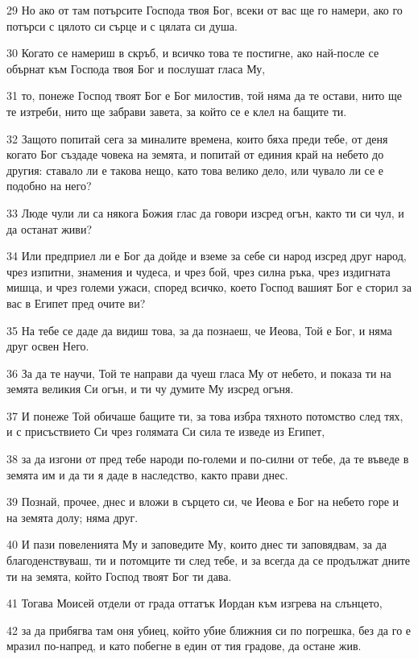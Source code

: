 \par 29 Но ако от там потърсите Господа твоя Бог, всеки от вас ще го намери, ако го потърси с цялото си сърце и с цялата си душа.
\par 30 Когато се намериш в скръб, и всичко това те постигне, ако най-после се обърнат към Господа твоя Бог и послушат гласа Му,
\par 31 то, понеже Господ твоят Бог е Бог милостив, той няма да те остави, нито ще те изтреби, нито ще забрави завета, за който се е клел на бащите ти.
\par 32 Защото попитай сега за миналите времена, които бяха преди тебе, от деня когато Бог създаде човека на земята, и попитай от единия край на небето до другия: ставало ли е такова нещо, като това велико дело, или чувало ли се е подобно на него?
\par 33 Люде чули ли са някога Божия глас да говори изсред огън, както ти си чул, и да останат живи?
\par 34 Или предприел ли е Бог да дойде и вземе за себе си народ изсред друг народ, чрез изпитни, знамения и чудеса, и чрез бой, чрез силна ръка, чрез издигната мишца, и чрез големи ужаси, според всичко, което Господ вашият Бог е сторил за вас в Египет пред очите ви?
\par 35 На тебе се даде да видиш това, за да познаеш, че Иеова, Той е Бог, и няма друг освен Него.
\par 36 За да те научи, Той те направи да чуеш гласа Му от небето, и показа ти на земята великия Си огън, и ти чу думите Му изсред огъня.
\par 37 И понеже Той обичаше бащите ти, за това избра тяхното потомство след тях, и с присъствието Си чрез голямата Си сила те изведе из Египет,
\par 38 за да изгони от пред тебе народи по-големи и по-силни от тебе, да те въведе в земята им и да ти я даде в наследство, както прави днес.
\par 39 Познай, прочее, днес и вложи в сърцето си, че Иеова е Бог на небето горе и на земята долу; няма друг.
\par 40 И пази повеленията Му и заповедите Му, които днес ти заповядвам, за да благоденствуваш, ти и потомците ти след тебе, и за всегда да се продължат дните ти на земята, който Господ твоят Бог ти дава.
\par 41 Тогава Моисей отдели от града оттатък Иордан към изгрева на слънцето,
\par 42 за да прибягва там оня убиец, който убие ближния си по погрешка, без да го е мразил по-напред, и като побегне в един от тия градове, да остане жив.

